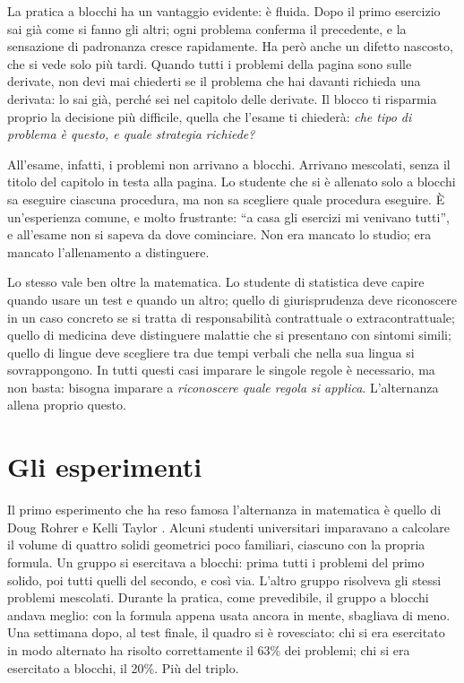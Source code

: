 La pratica a blocchi ha un vantaggio evidente: è fluida. Dopo il primo
esercizio sai già come si fanno gli altri; ogni problema conferma il
precedente, e la sensazione di padronanza cresce rapidamente. Ha però
anche un difetto nascosto, che si vede solo più tardi. Quando tutti i
problemi della pagina sono sulle derivate, non devi mai chiederti se il
problema che hai davanti richieda una derivata: lo sai già, perché sei
nel capitolo delle derivate. Il blocco ti risparmia proprio la
decisione più difficile, quella che l'esame ti chiederà: \emph{che tipo
di problema è questo, e quale strategia richiede?}

All'esame, infatti, i problemi non arrivano a blocchi. Arrivano
mescolati, senza il titolo del capitolo in testa alla pagina. Lo
studente che si è allenato solo a blocchi sa eseguire ciascuna
procedura, ma non sa scegliere quale procedura eseguire. È un'esperienza
comune, e molto frustrante: \enquote{a casa gli esercizi mi venivano
tutti}, e all'esame non si sapeva da dove cominciare. Non era mancato
lo studio; era mancato l'allenamento a distinguere.

Lo stesso vale ben oltre la matematica. Lo studente di statistica deve
capire quando usare un test e quando un altro; quello di giurisprudenza
deve riconoscere in un caso concreto se si tratta di responsabilità
contrattuale o extracontrattuale; quello di medicina deve distinguere
malattie che si presentano con sintomi simili; quello di lingue deve
scegliere tra due tempi verbali che nella sua lingua si
sovrappongono. In tutti questi casi imparare le singole regole è
necessario, ma non basta: bisogna imparare a \emph{riconoscere quale
regola si applica}. L'alternanza allena proprio questo.

\section{Gli esperimenti}

Il primo esperimento che ha reso famosa l'alternanza in matematica è
quello di Doug Rohrer e Kelli Taylor \parencite{rohrer2007}. Alcuni
studenti universitari imparavano a calcolare il volume di quattro
solidi geometrici poco familiari, ciascuno con la propria formula. Un
gruppo si esercitava a blocchi: prima tutti i problemi del primo
solido, poi tutti quelli del secondo, e così via. L'altro gruppo
risolveva gli stessi problemi mescolati. Durante la pratica, come
prevedibile, il gruppo a blocchi andava meglio: con la formula appena
usata ancora in mente, sbagliava di meno. Una settimana dopo, al test
finale, il quadro si è rovesciato: chi si era esercitato in modo
alternato ha risolto correttamente il 63\% dei problemi; chi si era
esercitato a blocchi, il 20\%. Più del triplo.

